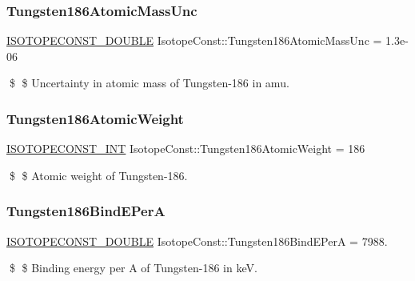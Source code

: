\subsubsection{\texorpdfstring{Tungsten186\+Atomic\+Mass\+Unc}{Tungsten186AtomicMassUnc}}
{\footnotesize\ttfamily \mbox{\hyperlink{group___isotope_const-_macros_ga8f45a7272ce02c0b4c65c44636ed719a}{I\+S\+O\+T\+O\+P\+E\+C\+O\+N\+S\+T\+\_\+\+D\+O\+U\+B\+LE}} Isotope\+Const\+::\+Tungsten186\+Atomic\+Mass\+Unc = 1.\+3e-\/06}

\$ \$ Uncertainty in atomic mass of Tungsten-\/186 in amu. \mbox{\label{group___isotope_const-_tungsten-_w186_ga40a04e563c18928935e437d11557bc56}} 
\subsubsection{\texorpdfstring{Tungsten186\+Atomic\+Weight}{Tungsten186AtomicWeight}}
{\footnotesize\ttfamily \mbox{\hyperlink{group___isotope_const-_macros_ga5f18360b3e99483a35c32d789e62621c}{I\+S\+O\+T\+O\+P\+E\+C\+O\+N\+S\+T\+\_\+\+I\+NT}} Isotope\+Const\+::\+Tungsten186\+Atomic\+Weight = 186}

\$ \$ Atomic weight of Tungsten-\/186. \mbox{\label{group___isotope_const-_tungsten-_w186_gab90865344d81ec52bcad3c6dbc0ff7e5}} 
\subsubsection{\texorpdfstring{Tungsten186\+Bind\+E\+PerA}{Tungsten186BindEPerA}}
{\footnotesize\ttfamily \mbox{\hyperlink{group___isotope_const-_macros_ga8f45a7272ce02c0b4c65c44636ed719a}{I\+S\+O\+T\+O\+P\+E\+C\+O\+N\+S\+T\+\_\+\+D\+O\+U\+B\+LE}} Isotope\+Const\+::\+Tungsten186\+Bind\+E\+PerA = 7988.}

\$ \$ Binding energy per A of Tungsten-\/186 in keV. \mbox{\label{group___isotope_const-_tungsten-_w186_ga68c0705c4532a1898b2a3177544ccf8e}} 

